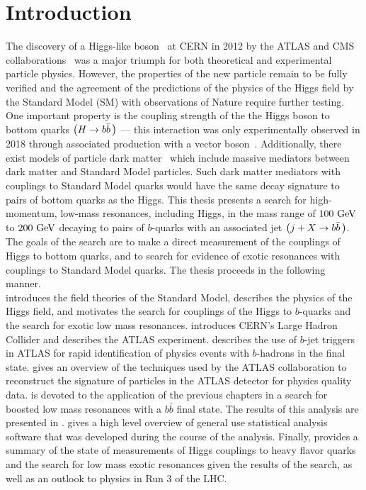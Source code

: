 \chapter{Introduction}\label{chapter:introduction}

The discovery of a Higgs-like boson~\cite{Higgs:1964ia,Higgs:1964pj,Higgs:1966ev,Englert:1964et,Guralnik:1964eu} at CERN in 2012 by the \Gls{ATLAS} and CMS collaborations~\cite{Aad:2012tfa,Chatrchyan:2012xdj} was a major triumph for both theoretical and experimental particle physics.
However, the properties of the new particle remain to be fully verified and the agreement of the predictions of the physics of the Higgs field by the \Gls{Standard Model} (SM) with observations of Nature require further testing.
One important property is the coupling strength of the the Higgs boson to bottom quarks $\left(H \to b\bar{b}\,\right)$ --- this interaction was only experimentally observed in 2018 through associated production with a vector boson~\cite{Aaboud:2018zhk,CMS:2018abb}.
Additionally, there exist models of particle dark matter~\cite{Abdallah:2015ter} which include massive mediators between dark matter and Standard Model particles.
Such \glspl{dark matter mediator} with couplings to Standard Model quarks would have the same decay signature to pairs of bottom quarks as the Higgs.
This thesis presents a search for high-momentum, low-mass resonances, including Higgs, in the mass range of $100~\mathrm{GeV}$ to $200~\mathrm{GeV}$ decaying to pairs of $b$-quarks with an associated jet $\left(j + X \to b\bar{b}\,\right)$.
The goals of the search are to make a direct measurement of the couplings of Higgs to bottom quarks, and to search for evidence of exotic resonances with couplings to Standard Model quarks.
The thesis proceeds in the following manner.\\

 introduces the field theories of the Standard Model, describes the physics of the Higgs field, and motivates the search for couplings of the Higgs to $b$-quarks and the search for exotic low mass resonances.
 introduces CERN's Large Hadron Collider and  describes the ATLAS experiment.
 describes the use of $b$-jet triggers in ATLAS for rapid identification of physics events with $b$-hadrons in the final state.
 gives an overview of the techniques used by the ATLAS collaboration to reconstruct the signature of particles in the ATLAS detector for physics quality data.
 is devoted to the application of the previous chapters in a search for boosted low mass resonances with a $b\bar{b}$ final state.
The results of this analysis are presented in .
 gives a high level overview of general use statistical analysis software that was developed during the course of the analysis.
Finally,  provides a summary of the state of measurements of Higgs couplings to heavy flavor quarks and the search for low mass exotic resonances given the results of the search, as well as an outlook to physics in Run 3 of the LHC.
